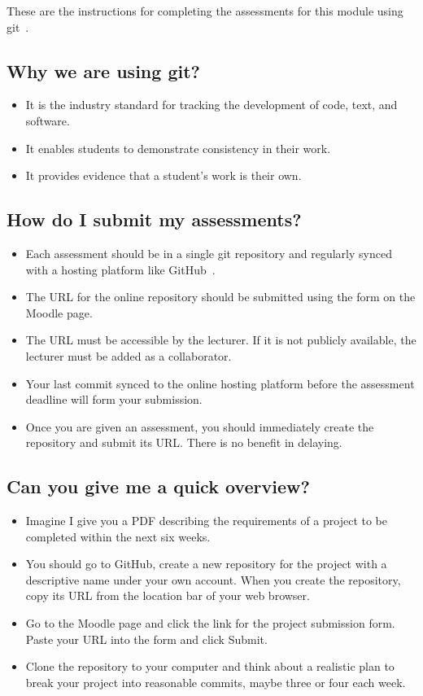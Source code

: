 \documentclass[12pt, a4paper, hidelinks]{scrartcl}
\title{\doctitle}
\author{\docauthor}
\date{}
\begin{document}
  
\maketitle

\noindent
These are the instructions for completing the assessments for this module using git~\cite{git}.
\subsection*{Why we are using git?}
  \begin{itemize}
    \item It is the industry standard for tracking the development of code, text, and software.
    \item It enables students to demonstrate consistency in their work.
    \item It provides evidence that a student's work is their own.
  \end{itemize}

  \subsection*{How do I submit my assessments?}
  \begin{itemize}
    \item Each assessment should be in a single git repository and regularly synced with a hosting platform like GitHub~\cite{github}.
    \item The URL for the online repository should be submitted using the form on the Moodle page.
    \item The URL must be accessible by the lecturer. If it is not publicly available, the lecturer must be added as a collaborator.
    \item Your last commit synced to the online hosting platform before the assessment deadline will form your submission.
    \item Once you are given an assessment, you should immediately create the repository and submit its URL. There is no benefit in delaying.
  \end{itemize}

  \subsection*{Can you give me a quick overview?}
  \begin{itemize}
    \item Imagine I give you a PDF describing the requirements of a project to be completed within the next six weeks.
    \item You should go to GitHub, create a new repository for the project with a descriptive name under your own account. When you create the repository, copy its URL from the location bar of your web browser.
    \item Go to the Moodle page and click the link for the project submission form. Paste your URL into the form and click Submit.
    \item Clone the repository to your computer and think about a realistic plan to break your project into reasonable commits, maybe three or four each week.
  \end{itemize}
\end{document}
